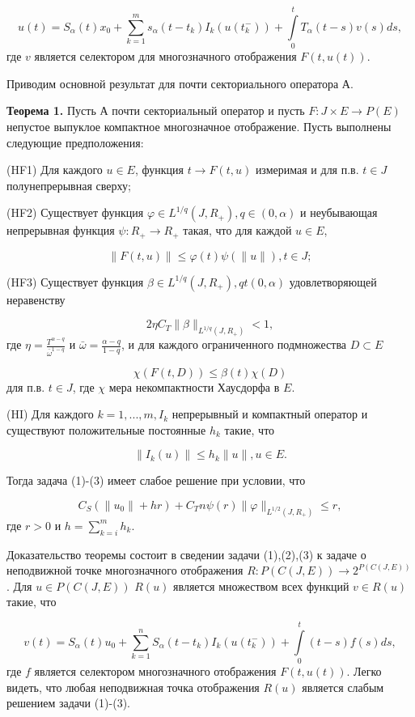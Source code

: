 $$u(t)=S_{\alpha}(t)x_{0}+\sum\limits_{k=1}^{m}s_{\alpha}(t-t_{k})I_{k}(u(t_{k}^{-}))+\int\limits_{0}^{t}T_{\alpha}(t-s)v(s)ds,$$
где $v$ является селектором для многозначного отображения $F(t,u(t))$.

Приводим основной результат для почти секториального оператора А.

\textbf{Теорема 1.} Пусть А почти секториальный оператор и пусть $F:J\times E\rightarrow P(E)$ непустое выпуклое компактное многозначное отображение. Пусть выполнены следующие предположения:

(HF1) Для каждого $u\in E$, функция $t\rightarrow F(t,u)$ измеримая и для п.в. $t\in J$ полунепрерывная сверху;

(HF2) Существует функция $\varphi\in L^{1/q}(J,R_{+}), q\in(0,\alpha)$ и неубывающая непрерывная функция $\psi:R_{+}\rightarrow R_{+}$ такая, что для каждой $u\in E$,

$$\|F(t,u)\|\leq\varphi(t)\psi(\|u\|), t\in J;$$

(HF3) Существует функция $\beta\in L^{1/q}(J,R_{+}), qt(0,\alpha)$ удовлетворяющей неравенству

$$2\eta C_{T}\|\beta\|_{L^{1/q}(J,R_{+})}<1,$$
где $\eta=\frac{T^{\alpha-q}}{\bar{\omega}^{1-q}}$ и $\bar{\omega}=\frac{\alpha-q}{1-q}$, и для каждого ограниченного подмножества $D\subset E$

$$\chi(F(t,D))\leq\beta(t)\chi(D)$$
для п.в. $t\in J$, где $\chi$ мера некомпактности Хаусдорфа в $E$.

(HI) Для каждого $k=1, ..., m, I_{k}$ непрерывный и компактный оператор и существуют положительные постоянные $h_{k}$ такие, что

$$\|I_{k}(u)\|\leq h_{k}\|u\|, u\in E.$$


Тогда задача (1)-(3) имеет слабое решение при условии, что

$$C_{S}(\|u_{0}\|+hr)+C_{T}n\psi(r)\|\varphi\|_{L^{1/2}(J,R_{+})}\leq r,$$
где $r>0$ и $h=\sum\limits_{k=i}^{m}h_{k}.$

Доказательство теоремы состоит в сведении задачи (1),(2),(3) к задаче о неподвижной точке многозначного отображения $R:P(C(J,E))\rightarrow 2^{P(C(J,E))}$. Для $u\in P(C(J,E))$ $R(u)$ является множеством всех функций $v\in R(u)$ такие, что

$$v(t)=S_{\alpha}(t)u_{0}+\sum\limits_{k=1}^{n}S_{\alpha}(t-t_{k})I_{k}(u(t_{k}^{-}))+\int\limits_{0}^{t}(t-s)f(s)ds,$$
где $f$ является селектором многозначного отображения $F(t,u(t))$. Легко видеть, что любая неподвижная точка отображения $R(u)$ является слабым решением задачи (1)-(3).

